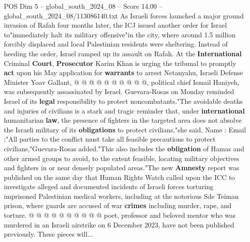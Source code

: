 \begin{textsample}{POS Dim 5 – global\_south\_2024\_08 – Score 14.00 – global\_south\_2024\_08/113086140.txt}
As Israeli forces launched a major ground invasion of Rafah four months later, the ICJ issued another order for Israel to"immediately halt its military offensive"in the city, where around 1.5 million forcibly displaced and local Palestinian residents were sheltering.
Instead of heeding the order, Israel ramped up its assault on Rafah.
At the \textbf{International} Criminal \textbf{Court}, \textbf{Prosecutor} Karim Khan is urging the tribunal to promptly \textbf{act} upon his May application for \textbf{warrants} to arrest Netanyahu, Israeli Defense Minister Yoav Gallant, @ @ @ @ @ @ @ @ @ @, political chief Ismail Haniyeh, was subsequently assassinated by Israel.
Guevara-Rosas on Monday reminded Israel of its \textbf{legal} responsibility to protect noncombatants."The avoidable deaths and injuries of civilians is a stark and tragic reminder that, under \textbf{international} humanitarian \textbf{law}, the presence of fighters in the targeted area does not absolve the Israeli military of its \textbf{obligations} to protect civilians,"she said.
Name : Email :"All parties to the conflict must take all feasible precautions to protect civilians,"Guevara-Rosas added."This also includes the \textbf{obligation} of Hamas and other armed groups to avoid, to the extent feasible, locating military objectives and fighters in or near densely populated areas."The new \textbf{Amnesty} report was published on the same day that Human Rights Watch called upon the ICC to investigate alleged and documented incidents of Israeli forces torturing imprisoned Palestinian medical workers, including at the notorious Sde Teiman prison, where guards are accused of war \textbf{crimes} including murder, rape, and torture. @ @ @ @ @ @ @ @ @ @ poet, professor and beloved mentor who was murdered in an Israeli airstrike on 6 December 2023, have not been published previously.
These pieces will...

\end{textsample}
